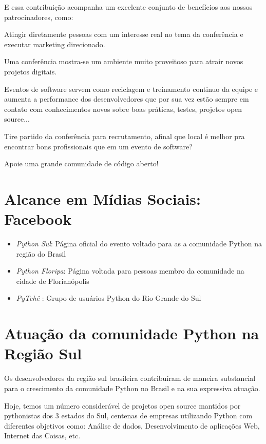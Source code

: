 \documentclass[12pt]{article}
\begin{document}
E essa contribuição acompanha um excelente conjunto de benefícios aos nossos patrocinadores, como:
\begin{description}[align=right,labelwidth=4cm]
    \item [Visibilidade:] Atingir diretamente pessoas com um interesse real no tema da conferência e executar marketing direcionado.
    \item [Oportunidades:] Uma conferência mostra-se um ambiente muito proveitoso para atrair novos projetos digitais.
    \item [Produtividade:] Eventos de software servem como reciclagem e treinamento continuo da equipe e aumenta a performance dos desenvolvedores que por sua vez estão sempre em contato com conhecimentos novos sobre boas práticas, testes, projetos open source...
    \item [Contratação:] Tire partido da conferência para recrutamento, afinal que local é melhor pra encontrar bons profissionais que em um evento de software?
    \item [Patrocínio:] Apoie uma grande comunidade de código aberto!
\end{description}

\section{Alcance em Mídias Sociais: Facebook}
\begin{itemize}[label={}]
    \item \emph{Python Sul}: Página oficial do evento voltado para as a comunidade Python na região do Brasil
    \item \emph{Python Floripa}: Página voltada para pessoas membro da comunidade na cidade de Florianópolis
    \item \emph{PyTchê }: Grupo de usuários Python do Rio Grande do Sul
\end{itemize}

\section{Atuação da comunidade Python na Região Sul}

Os desenvolvedores da região sul brasileira contribuíram de maneira substancial para o crescimento da comunidade Python no Brasil e na sua expressiva atuação.

Hoje, temos um número considerável de projetos open source mantidos por pythonistas dos 3 estados do Sul, centenas de empresas utilizando Python com diferentes objetivos como: Análise de dados, Desenvolvimento de aplicações Web, Internet das Coisas, etc.
\end{document}
